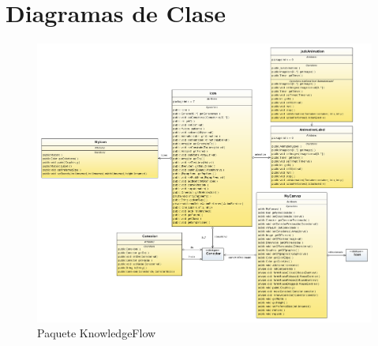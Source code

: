 \documentclass[letterpaper,12pt]{report}
\begin{document}
\addtolength{\textwidth}{-5cm}
\chapter{Diagramas de Clase}

\begin{figure}
\centering
\includegraphics[width=1.8\textwidth]{KnowledgeFlow.png}
\caption{Paquete KnowledgeFlow}
\end{figure}
\newpage
\end{document}
